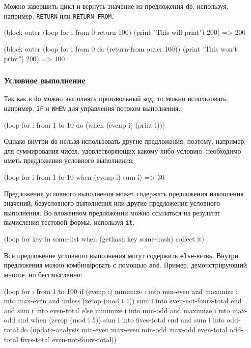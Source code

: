 Можно завершить цикл и вернуть значение из предложения \lstinline{do}, используя, например, \lstinline{RETURN} или \lstinline{RETURN-FROM}.
\begin{cllst}{}{}
(block outer
    (loop for i from 0 return 100)
    (print "This will print")
    200) => 200

(block outer
    (loop for i from 0 do (return-from outer 100))
    (print "This won't print")
    200) => 100
\end{cllst}

\subsubsection{Условное выполнение}
Так как в \lstinline{do} можно выполнять произвольный код, то можно использовать, например, \lstinline{IF} и \lstinline{WHEN} для управления потоком выполнения.
\begin{cllst}{}{}
(loop for i from 1 to 10 do (when (evenp i) (print i)))
\end{cllst}

Однако внутри \lstinline{do} нельзя использовать другие предложения, поэтому, например, для суммирования чисел, удовлетворяющих какому-либо условию, необходимо иметь предложения условного выполнения:
\begin{cllst}{}{}
(loop for i from 1 to 10 when (evenp i) sum i) => 30
\end{cllst}

Предложение условного выполнения может содержать предложения накопления значений, безусловного выполнения или другие предложения условного выполнения. Во вложенном предложении можно ссылаться на результат вычисления тестовой формы, используя \lstinline{it}.
\begin{cllst}{}{}
(loop for key in some-list when (gethash key some-hash) collect it)
\end{cllst}

Все предложение условного выполнения могут содержить \lstinline{else}-ветвь. Внутри предложения можно комбинировать с помощью \lstinline{and}. Пример, демонстрирующий многое, но бессмысленно:
\begin{cllst}{}{}
(loop for i from 1 to 100
   if (evenp i)
     minimize i into min-even and 
     maximize i into max-even and
     unless (zerop (mod i 4))
       sum i into even-not-fours-total
     end
     and sum i into even-total
   else
     minimize i into min-odd and
     maximize i into max-odd and
     when (zerop (mod i 5)) 
       sum i into fives-total
     end
   and sum i into odd-total
   do (update-analysis min-even
                       max-even
                       min-odd
                       max-odd
                       even-total
                       odd-total
                       fives-total
                       even-not-fours-total))
\end{cllst}
